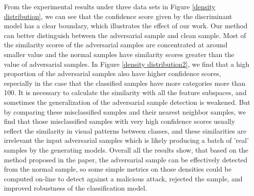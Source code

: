 \documentclass{ieeeaccess}
\begin{document}
From the experimental results under three data sets in Figure \ref{density distribution}, we can see that the confidence score given by the discriminant model has a clear boundary, which illustrates the effect of our work. Our method can better distinguish between the adversarial sample and clean sample.
Most of the similarity scores of the adversarial samples are concentrated at around smaller value and the normal samples have similarity scores greater than the value of adversarial samples.
In Figure \ref{density distribution2}, we find that a high proportion of the adversarial samples also have higher confidence scores, especially in the case that the classified samples have more categories more than 100. It is necessary to calculate the similarity with all the feature subspaces, and sometimes the generalization of the adversarial sample detection is weakened. But by comparing these misclassified samples and their nearest neighbor samples, we find that those misclassified samples with very high confidence scores usually reflect the similarity in visual patterns between classes, and these similarities are irrelevant the input adversarial samples which is likely producing a batch of 'real' samples by the generating models.
Overall all the results show, that based on the method proposed in the paper, the adversarial sample can be effectively detected from the normal sample, so some simple metrics on those densities could be computed on-line to detect against a malicious attack, rejected the sample, and improved robustness of the classification model.
\end{document}
